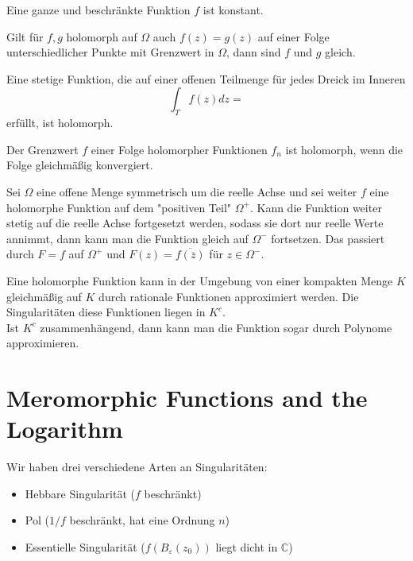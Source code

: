 \documentclass[11pt]{article}
\newenvironment{problem}[1]{
    \begin{trivlist}
        \item[\hskip \labelsep {\bfseries #1}] }{
    \end{trivlist}\normalshape
}
\newcommand{\C}{\mathbb{C}}
\begin{document}
    \begin{problem}{Liouville}
        Eine ganze und beschränkte Funktion $f$ ist konstant.
    \end{problem}

    \begin{problem}{Analytische Fortsetzung}
        Gilt für $f,g$ holomorph auf $\Omega$ auch $f(z)=g(z)$ auf einer Folge unterschiedlicher Punkte mit
        Grenzwert in $\Omega$, dann sind $f$ und $g$ gleich.
    \end{problem}

    \begin{problem}{Morera}
        Eine stetige Funktion, die auf einer offenen Teilmenge für jedes Dreick im Inneren
        $$\int_T f(z)dz=$$
        erfüllt, ist holomorph.
    \end{problem}

    \begin{problem}{Folgen holomorpher Funktionen}
        Der Grenzwert $f$ einer Folge holomorpher Funktionen $f_n$ ist holomorph, wenn die
        Folge gleichmäßig konvergiert.
    \end{problem}

    \begin{problem}{Schwarz reflection principle}
        Sei $\Omega$ eine offene Menge symmetrisch um die reelle Achse und sei weiter $f$ eine
        holomorphe Funktion auf dem "positiven Teil" $\Omega^+$. Kann die Funktion weiter
        stetig auf die reelle Achse fortgesetzt werden, sodass sie dort nur reelle Werte annimmt, dann
        kann man die Funktion gleich auf $\Omega^-$ fortsetzen. Das passiert durch $F=f$ auf $\Omega^+$ und
        $F(z)=\overline{f(\overline{z})}$ für $z\in\Omega^-$.
    \end{problem}

    \begin{problem}{Runge's approximation theorem}
        Eine holomorphe Funktion kann in der Umgebung von einer kompakten Menge $K$ gleichmäßig
        auf $K$ durch rationale Funktionen approximiert werden. Die Singularitäten diese Funktionen liegen
        in $K^c$. \\
        Ist $K^c$ zusammenhängend, dann kann man die Funktion sogar durch Polynome approximieren.
    \end{problem}
    
    \section{Meromorphic Functions and the Logarithm}
    \begin{problem}{Singularities}
        Wir haben drei verschiedene Arten an Singularitäten:
        \begin{itemize}
            \item Hebbare Singularität ($f$ beschränkt)
            \item Pol ($1/f$ beschränkt, hat eine Ordnung $n$)
            \item Essentielle Singularität ($f(B_\varepsilon(z_0))$ liegt dicht in $\C$)
        \end{itemize}
    \end{problem}
\end{document}
